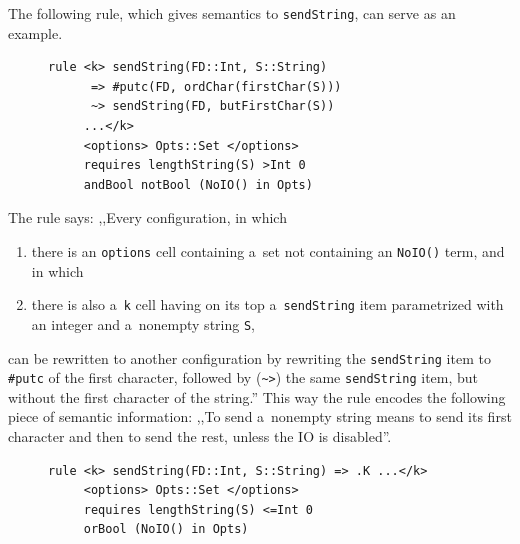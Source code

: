 \documentclass{fithesis3}
\begin{document}
The following rule, which gives semantics to \texttt{sendString}, can serve as an example.
\begin{figure}[ht]
\begin{lstlisting}
rule <k> sendString(FD::Int, S::String)
      => #putc(FD, ordChar(firstChar(S)))
      ~> sendString(FD, butFirstChar(S))
     ...</k>
     <options> Opts::Set </options>
     requires lengthString(S) >Int 0
     andBool notBool (NoIO() in Opts)
\end{lstlisting}
\end{figure}

The rule says: ,,Every configuration, in which
\begin{enumerate}
\item there is an \texttt{options} cell containing a~set not containing an \texttt{NoIO()} term, and in which
\item there is also a~\texttt{k} cell having on its top a~\texttt{sendString} item parametrized with an integer and a~nonempty string \texttt{S},
\end{enumerate}
can be rewritten to another configuration by rewriting the \texttt{sendString} item to \texttt{\#putc} of the first character, followed by (\lstinline{~>}) the same \texttt{sendString} item, but without the first character of the string.''
This way the rule encodes the following piece of semantic information: ,,To send a~nonempty string means to send its first character and then to send the rest, unless the IO is disabled''.


%
%
%


\begin{figure}
\begin{lstlisting}
rule <k> sendString(FD::Int, S::String) => .K ...</k>
     <options> Opts::Set </options>
     requires lengthString(S) <=Int 0
     orBool (NoIO() in Opts)
\end{lstlisting}
\end{figure}
\end{document}
